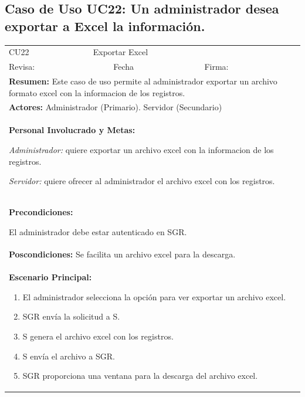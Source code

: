 		\subsection{Caso de Uso UC22: Un administrador desea exportar a Excel la información.}
			\begin{longtable}{|l|p{5.5cm}|l|p{2cm}|l|p{1.9cm}|} \hline
					\cellcolor{grisOscuro} CU22 & \multicolumn{4}{|l|}{  \cellcolor{grisOscuro} Exportar Excel} &  \cellcolor{grisClaro}\multirow{2}{1cm}{} \\ \cline{1-5}
					\cellcolor{grisOscuro} Revisa: &  \cellcolor{grisClaro} &  \cellcolor{grisOscuro} Fecha &  \cellcolor{grisClaro} &  \cellcolor{grisOscuro} Firma: & \cellcolor{grisClaro} \\ \hline
					\multicolumn{6}{|p{15cm}|}{ \textbf{Resumen: } Este caso de uso permite al administrador exportar un archivo formato excel con la informacion de los registros.

					} \\ \hline

					\multicolumn{6}{|p{15cm}|}{ \textbf{Actores: } Administrador (Primario). Servidor (Secundario)

					} \\ \hline

					\multicolumn{6}{|p{15cm}|}{ \textbf{Personal Involucrado y Metas: }
					
					\emph{Administrador:} quiere exportar un archivo excel con la informacion de los registros.

					\emph{Servidor:} quiere ofrecer al administrador el archivo excel con los registros.
					} \\ \hline

					\multicolumn{6}{|p{15cm}|}{ \textbf{Precondiciones: } 
					
					El administrador debe estar autenticado en SGR.

					} \\ \hline

					\multicolumn{6}{|p{15cm}|}{ \textbf{Poscondiciones: } Se facilita un archivo excel para la descarga.

					} \\ \hline

					\multicolumn{6}{|p{15cm}|}{ \textbf{Escenario Principal: }

					\begin{enumerate}
							\item El administrador selecciona la opción para ver exportar un archivo excel.
							\item SGR envía la solicitud a S.
							\item S genera el archivo excel con los registros.
							\item S envía el archivo a SGR.
							\item SGR proporciona una ventana para la descarga del archivo excel.
					\end{enumerate}

}
\end{longtable}
